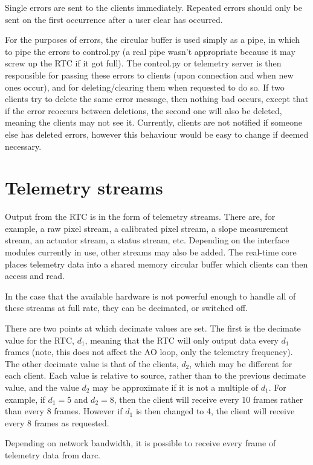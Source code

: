 \documentclass[a4,10pt]{article}
\begin{document}
Single errors are sent to the clients immediately.  Repeated errors
should only be sent on the first occurrence after a user clear has
occurred.  

For the purposes of errors, the circular buffer is used simply as a
pipe, in which to pipe the errors to control.py (a real pipe wasn't
appropriate because it may screw up the RTC if it got full).  The
control.py or telemetry server is then responsible for passing these
errors to clients (upon connection and when new ones occur), and for
deleting/clearing them when requested to do so.  If two clients try to
delete the same error message, then nothing bad occurs, except that if
the error reoccurs between deletions, the second one will also be
deleted, meaning the clients may not see it.  Currently, clients are
not notified if someone else has deleted errors, however this
behaviour would be easy to change if deemed necessary.

\section{Telemetry streams}
Output from the RTC is in the form of telemetry streams.  There are,
for example, a raw pixel stream, a calibrated pixel stream, a slope
measurement stream, an actuator stream, a status stream, etc.
Depending on the interface modules currently in use, other streams may
also be added.  The real-time core places telemetry data into a shared
memory circular buffer which clients can then access and read.

In the case that the available hardware is not powerful enough to
handle all of these streams at full rate, they can be decimated, or
switched off.

There are two points at which decimate values are set.  The first is
the decimate value for the RTC, $d_1$, meaning that the RTC will only
output data every $d_1$ frames (note, this does not affect the AO
loop, only the telemetry frequency).  The other decimate value is that
of the clients, $d_2$, which may be different for each client.  Each value is relative to source, rather than to the
previous decimate value, and the value $d_2$ may be
approximate if it is not a multiple of $d_1$.  For example, if $d_1=5$
and $d_2=8$, then the client will receive every 10 frames rather than
every 8 frames.  However if $d_1$ is then changed to 4, the client
will receive every 8 frames as requested.

Depending on network bandwidth, it is possible to receive every frame
of telemetry data from darc.
\end{document}
